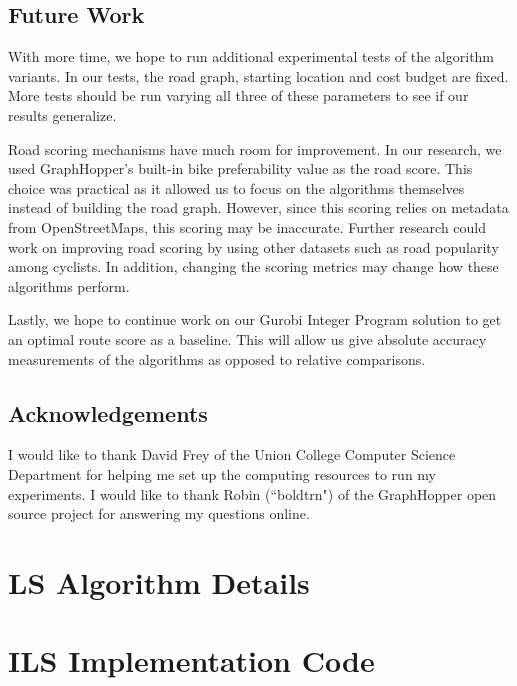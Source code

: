\documentclass[honors]{union-cs-thesis}
\newcommand{\td}{\todo[inline]}
\begin{document}
\subsection{Future Work}
With more time, we hope to run additional experimental tests of the algorithm variants. In our tests, the road graph, starting location and cost budget are fixed. More tests should be run varying all three of these parameters to see if our results generalize.  

Road scoring mechanisms have much room for improvement. In our research, we used GraphHopper's built-in bike preferability value as the road score. This choice was practical as it allowed us to focus on the algorithms themselves instead of building the road graph. However, since this scoring relies on metadata from OpenStreetMaps, this scoring may be inaccurate. Further research could work on improving road scoring by using other datasets such as road popularity among cyclists. In addition, changing the scoring metrics may change how these algorithms perform.

Lastly, we hope to continue work on our Gurobi Integer Program solution to get an optimal route score as a baseline. This will allow us give absolute accuracy measurements of the algorithms as opposed to relative comparisons.

\subsection{Acknowledgements}
I would like to thank David Frey of the Union College Computer Science Department for helping me set up the computing resources to run my experiments. I would like to thank Robin (``boldtrn") of the GraphHopper open source project for answering my questions online.   


\begin{appendices}

\section{LS Algorithm Details}
\td{WRITE ME}

\section{ILS Implementation Code}
\td{WRITE ME}
    
\end{appendices}




\FloatBarrier


\end{document}
